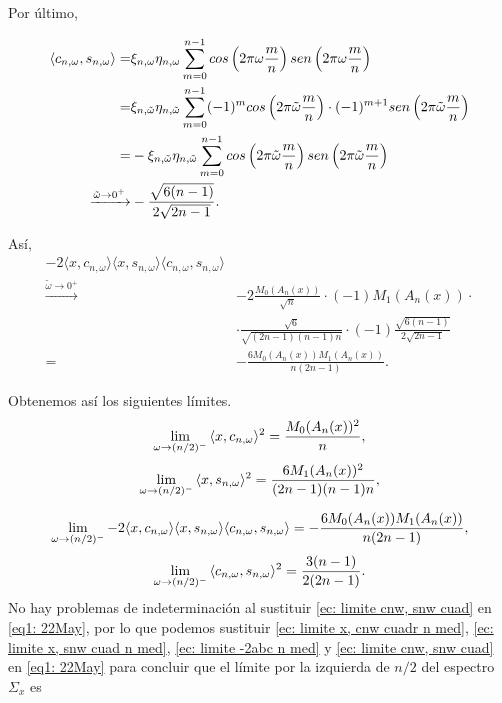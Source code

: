 Por último,  

\begin{align*}
\langle
c_{n, \omega}, s_{n, \omega}
\rangle = &
\xi_{n, \omega} \eta_{n, \omega}
\suma{m=0}{n-1}{
cos\left(
2 \pi \omega\frac{m}{n}
\right)
sen\left(
2 \pi \omega\frac{m}{n}
\right)
} \\
= &
\xi_{n, \tilde{\omega}} \eta_{n, \tilde{\omega}}
\suma{m=0}{n-1}{
(-1)^{m}cos\left(
2 \pi \tilde{\omega} \frac{m}{n}
\right) \cdot (-1)^{m+1}
sen\left(
2 \pi \tilde{\omega} \frac{m}{n}
\right)
}
\\
= &
-\xi_{n, \tilde{\omega}} \eta_{n, \tilde{\omega}}
\suma{m=0}{n-1}{
cos\left(
2 \pi \tilde{\omega}\frac{m}{n}
\right) 
sen\left(
2 \pi \tilde{\omega}\frac{m}{n}
\right)
}
\\
\xrightarrow{\tilde{\omega} \rightarrow 0^{+}}&
- \frac{\sqrt{6(n-1)}}{2 \sqrt{2n-1}}.
\end{align*}

Así,
\begin{align*}
-2 \langle x, c_{n, \omega} \rangle
\langle x, s_{n, \omega} \rangle
\langle c_{n, \omega}, s_{n, \omega} \rangle & \\
\xrightarrow{\tilde{\omega} \rightarrow 0^{+}} & 
-2 \frac{M_{0}(A_{n}(x))}{\sqrt{n}}
\cdot 
(-1) M_{1}(A_{n}(x)) \cdot \\
& \cdot
\frac{\sqrt{6}}{
\sqrt{(2n-1)(n-1)n}}
\cdot (-1)
\frac{\sqrt{6(n-1)}}{2 \sqrt{2n-1}}
\\
= & - \frac{6 M_{0}(A_{n}(x)) M_{1}(A_{n}(x)) }{n(2n-1)}.
\end{align*}


Obtenemos así los siguientes límites.
\begin{equation}
\label{ec: limite x, cnw cuadr n med}
\lim\limits_{\omega \rightarrow (n/2)^{-}}{\langle
x, c_{n, \omega}
\rangle^{2} }
= \frac{M_{0}(A_{n}(x))^{2}}{n},
\end{equation}
\begin{equation}
\label{ec: limite x, snw cuad n med}
\lim\limits_{\omega \rightarrow (n/2)^{-}}{\langle
x, s_{n, \omega}
\rangle^{2} }
= \frac{6M_{1}(A_{n}(x))^{2}}{(2n-1)(n-1)n},
\end{equation}

\begin{equation}
\label{ec: limite -2abc n med}
\lim\limits_{\omega \rightarrow (n/2)^{-}}{
-2 \langle x, c_{n, \omega} \rangle
\langle x, s_{n, \omega} \rangle
\langle c_{n, \omega}, s_{n, \omega} \rangle
= 
- \frac{6M_{0}(A_{n}(x))M_{1}(A_{n}(x))}{n(2n-1)},
}
\end{equation}
\begin{equation}
\label{ec: limite cnw, snw cuad}
\lim\limits_{\omega \rightarrow (n/2)^{-}}{\langle
c_{n, \omega}, s_{n, \omega}
\rangle^{2} }
= \frac{3(n-1)}{2(2n-1)}.
\end{equation}
No hay problemas de indeterminación al 
sustituir \eqref{ec: limite cnw, snw cuad} en 
\eqref{eq1: 22May}, por lo que podemos 
sustituir 
\eqref{ec: limite x, cnw cuadr n med}, 
\eqref{ec: limite x, snw cuad n med}, 
\eqref{ec: limite -2abc n med} y 
\eqref{ec: limite cnw, snw cuad} en 
\eqref{eq1: 22May} para concluir que el límite por la izquierda
de $n/2$ del espectro $\Sigma_{x}$ es

